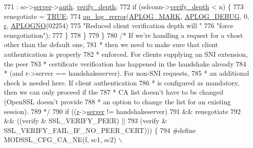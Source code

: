 \begin{DoxyCode}
{{771                                         : sc->\hyperlink{structSSLSrvConfigRec_a7941dbc2f9fa504b3968a4afdc4b96fc}{server}->\hyperlink{structmodssl__ctx__t_a55144723f90510fb094554f7652f0ef0}{auth}.
      \hyperlink{structmodssl__auth__ctx__t_ab1486d9b2a656743afb44f3fc70401d5}{verify\_depth};
772                 \textcolor{keywordflow}{if} (sslconn->\hyperlink{structSSLConnRec_a72fc657db836b8eb8d66919de3ff2300}{verify\_depth} < n) \{
773                     renegotiate = \hyperlink{group__MOD__SSL__PRIVATE_gaa8cecfc5c5c054d2875c03e77b7be15d}{TRUE};
774                     \hyperlink{group__APACHE__CORE__LOG_ga4c112558ccffd6b363da102b2052d2a6}{ap\_log\_rerror}(\hyperlink{group__APACHE__CORE__LOG_ga655e126996849bcb82e4e5a14c616f4a}{APLOG\_MARK}, \hyperlink{group__APACHE__CORE__LOG_gadfcef90537539cf2b7d35cfbbbafeb93}{APLOG\_DEBUG}, 0, 
      \hyperlink{group__APACHE__CORE__CONFIG_ga091cdd45984e865a888a4f8bb8fe107a}{r}, \hyperlink{group__APACHE__CORE__LOG_ga1dee8a07e06bc5b3de8b89662c2cd666}{APLOGNO}(02254)
775                                   \textcolor{stringliteral}{"Reduced client verification depth will "}
776                                   \textcolor{stringliteral}{"force renegotiation"});
777                 \}
778             \}
779         \}
780         \textcolor{comment}{/* If we're handling a request for a vhost other than the default one,}
781 \textcolor{comment}{         * then we need to make sure that client authentication is properly}
782 \textcolor{comment}{         * enforced. For clients supplying an SNI extension, the peer}
783 \textcolor{comment}{         * certificate verification has happened in the handshake already}
784 \textcolor{comment}{         * (and r->server == handshakeserver). For non-SNI requests,}
785 \textcolor{comment}{         * an additional check is needed here. If client authentication}
786 \textcolor{comment}{         * is configured as mandatory, then we can only proceed if the}
787 \textcolor{comment}{         * CA list doesn't have to be changed (OpenSSL doesn't provide}
788 \textcolor{comment}{         * an option to change the list for an existing session).}
789 \textcolor{comment}{         */}
790         \textcolor{keywordflow}{if} ((\hyperlink{group__APACHE__CORE__CONFIG_ga091cdd45984e865a888a4f8bb8fe107a}{r}->\hyperlink{structrequest__rec_a4a8059930ce9409cb885fdeef6921b7b}{server} != handshakeserver)
791             && renegotiate
792             && ((verify & SSL\_VERIFY\_PEER) ||
793                 (verify & SSL\_VERIFY\_FAIL\_IF\_NO\_PEER\_CERT))) \{
794 \textcolor{preprocessor}{#define MODSSL\_CFG\_CA\_NE(f, sc1, sc2) \(\backslash\)}
}}
\end{DoxyCode}
